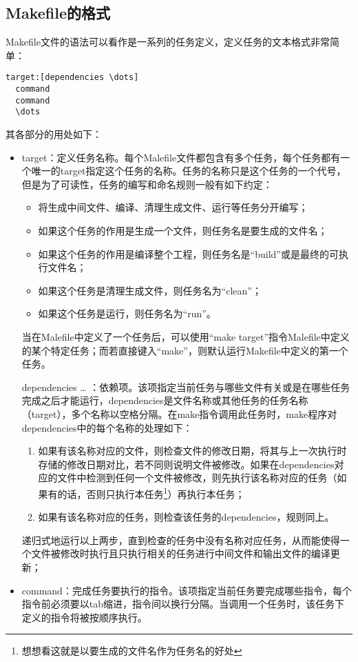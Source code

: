 \subsection{Makefile的格式}
Makefile文件的语法可以看作是一系列的任务定义，定义任务的文本格式非常简单：
\begin{lstlisting}
target:[dependencies \dots]
  command
  command
  \dots
\end{lstlisting}
其各部分的用处如下：
\begin{itemize}
  \item target：定义任务名称。每个Malefile文件都包含有多个任务，每个任务都有一个唯一的target指定这个任务的名称。任务的名称只是这个任务的一个代号，但是为了可读性，任务的编写和命名规则一般有如下约定：
  \begin{itemize}
    \item 将生成中间文件、编译、清理生成文件、运行等任务分开编写；
    \item 如果这个任务的作用是生成一个文件，则任务名是要生成的文件名；
    \item 如果这个任务的作用是编译整个工程，则任务名是“build”或是最终的可执行文件名；
    \item 如果这个任务是清理生成文件，则任务名为“clean”；
    \item 如果这个任务是运行，则任务名为“run”。
  \end{itemize}
  当在Malefile中定义了一个任务后，可以使用“make target”指令Malefile中定义的某个特定任务；而若直接键入“make”，则默认运行Makefile中定义的第一个任务。
  \item [dependencies \dots]：依赖项。该项指定当前任务与哪些文件有关或是在哪些任务完成之后才能运行，dependencies是文件名称或其他任务的任务名称（target），多个名称以空格分隔。在make指令调用此任务时，make程序对dependencies中的每个名称的处理如下：
  \begin{enumerate}
    \item 如果有该名称对应的文件，则检查文件的修改日期，将其与上一次执行时存储的修改日期对比，若不同则说明文件被修改。如果在dependencies对应的文件中检测到任何一个文件被修改，则先执行该名称对应的任务（如果有的话，否则只执行本任务\footnote{想想看这就是以要生成的文件名作为任务名的好处}）再执行本任务；
    \item 如果有该名称对应的任务，则检查该任务的dependencies，规则同上。
  \end{enumerate}
  递归式地运行以上两步，直到检查的任务中没有名称对应任务，从而能使得一个文件被修改时执行且只执行相关的任务进行中间文件和输出文件的编译更新；
  \item command：完成任务要执行的指令。该项指定当前任务要完成哪些指令，每个指令前必须要以tab缩进，指令间以换行分隔。当调用一个任务时，该任务下定义的指令将被按顺序执行。
\end{itemize}

